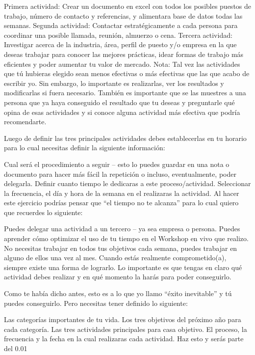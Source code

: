 \documentclass[12pt]{book}
\begin{document}
Primera actividad: Crear un documento en excel con todos los posibles puestos de trabajo, número de contacto y referencias, y alimentara base de datos todas las semanas.
Segunda actividad: Contactar estratégicamente a cada persona para coordinar una posible llamada, reunión, almuerzo o cena.
Tercera actividad: Investigar acerca de la industria, área, perfil de puesto y/o empresa en la que deseas trabajar para conocer las mejores prácticas, idear formas de trabajo más eficientes y poder aumentar tu valor de mercado.
Nota: Tal vez las actividades que tú hubieras elegido sean menos efectivas o más efectivas que las que acabo de escribir yo. Sin embargo, lo importante es realizarlas, ver los resultados y modificarlas si fuera necesario. También es importante que se las muestres a una persona que ya haya conseguido el resultado que tu deseas y preguntarle qué opina de esas actividades y si conoce alguna actividad más efectiva que podría recomendarte.

Luego de definir las tres principales actividades debes establecerlas en tu horario para lo cual necesitas definir la siguiente información:

Cual será el procedimiento a seguir – esto lo puedes guardar en una nota o documento para hacer más fácil la repetición o incluso, eventualmente, poder delegarla.
Definir cuanto tiempo le dedicaras a este proceso/actividad.
Seleccionar la frecuencia, el día y hora de la semana en el realizaras la actividad.
Al hacer este ejercicio podrías pensar que “el tiempo no te alcanza” para lo cual quiero que recuerdes lo siguiente:

Puedes delegar una actividad a un tercero – ya sea empresa o persona.
Puedes aprender cómo optimizar el uso de tu tiempo en el Workshop en vivo que realizo.
No necesitas trabajar en todos tus objetivos cada semana, puedes trabajar en alguno de ellos una vez al mes.
Cuando estás realmente comprometido(a), siempre existe una forma de lograrlo.
Lo importante es que tengas en claro qué actividad debes realizar y en qué momento la harás para poder conseguirlo.

Como te había dicho antes, esto es a lo que yo llamo “éxito inevitable” y tú puedes conseguirlo. Pero necesitas tener definido lo siguiente:

Las categorías importantes de tu vida.
Los tres objetivos del próximo año para cada categoría.
Las tres actividades principales para casa objetivo.
El proceso, la frecuencia y la fecha en la cual realizaras cada actividad.
Haz esto y serás parte del 0.01%
\end{document}

